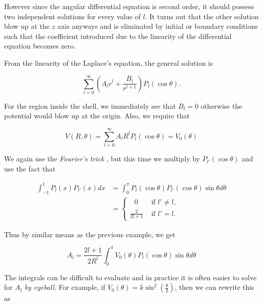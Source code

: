 \documentclass[a4paper,12pt]{report}
\begin{document}
\begin{example_template}
		However since the angular differential equation is second order, it should possess two independent solutions for every value of \(l\). It turns out that the other solution blow up at the \(z\) axis anyways and is eliminated by initial or boundary conditions such that the coefficient introduced due to the linearity of the differential equation becomes zero.
		
		From the linearity of the Laplace's equation, the general solution is
		
		\begin{equation}
			\sum_{l=0}^{\infty} (A_{l} r^{l} + \frac{B_{l} }{r^{l+1} } )P_{l} (\cos \theta). \label{sphlap1} 
		\end{equation}
		
		For the region inside the shell, we immediately see that \(B_{l} = 0\) otherwise the potential would blow up at the origin. Also, we require that 
		
		\begin{equation}
			V(R,\theta ) = \sum_{l=0}^{\infty} A_{l} R^{l} P_{l} (\cos \theta ) = V_{0} (\theta )
		\end{equation}
		
		We again use the \emph{Fourier's trick} , but this time we multiply by \(P_{l'} (\cos \theta )\) and use the fact that 
		
		\begin{equation}
			\begin{aligned}
				\int_{-1}^{1} P_{l} (x) P_{l'} (x) dx &= \int_{0}^{\pi } P_{l} (\cos \theta ) P_{l'} (\cos \theta ) \sin \theta d\theta \\ &= \begin{cases}
					~~~ 0 &\text { if } l'\neq l, \\ \frac{2}{2l+1} &\text { if } l' = l.
				\end{cases}
			\end{aligned}
		\end{equation}
		
		Thus by similar means as the previous example, we get
		
		\begin{equation}
			A_{l} = \frac{2l+1}{2R^{l} } \int_{0}^{\pi } V_{0} (\theta ) P_{l} (\cos \theta ) \sin \theta d\theta 
		\end{equation}
		
		The integrals can be difficult to evaluate and in practice it is often easier to solve for \(A_{l} \) \emph{by eyeball}. For example, if \(V_0(\theta ) = k\sin ^2(\frac{\theta }{2} )\), then we can rewrite this as
		

\end{example_template}
\end{document}
